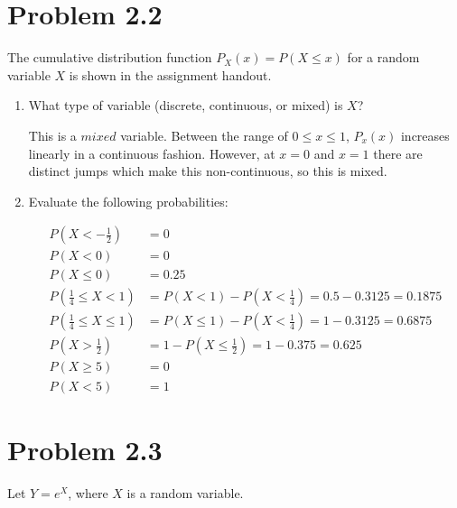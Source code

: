 \documentclass[11pt]{article}
\begin{document}
\newpage
\section*{Problem 2.2}
The cumulative distribution function $P_X(x) = P(X \leq x)$ for a random variable $X$ is shown in the assignment handout.

\begin{enumerate}[label=(\alph*)]
    \item What type of variable (discrete, continuous, or mixed) is $X$?
    \begin{solution}
        This is a $mixed$ variable.
        Between the range of $0 \leq x \leq 1$, $P_x(x)$ increases linearly in a continuous fashion.
        However, at $x = 0$ and $x = 1$ there are distinct jumps which make this non-continuous, so this is mixed.
    \end{solution}

    \vspace{2em}

    \item Evaluate the following probabilities:

    \begin{align*}
        P\left(X < -\tfrac{1}{2}\right) &= 0 \\[1.5em]
        P(X < 0) &= 0 \\[1.5em]
        P(X \leq 0) &= 0.25\\[1.5em]
        P\left(\tfrac{1}{4} \leq X < 1\right) &= P(X < 1) - P(X < \tfrac{1}{4}) = 0.5 - 0.3125 = 0.1875 \\[1.5em]
        P\left(\tfrac{1}{4} \leq X \leq 1\right) &= P(X \leq 1) - P(X < \tfrac{1}{4}) = 1 - 0.3125 = 0.6875 \\[1.5em]
        P\left(X > \tfrac{1}{2}\right) &= 1 - P(X \leq \tfrac{1}{2}) = 1 - 0.375 = 0.625 \\[1.5em]
        P(X \geq 5) &= 0\\[1.5em]
        P(X < 5) &= 1
    \end{align*}

\end{enumerate}

\newpage
\section*{Problem 2.3}
Let $Y = e^X$, where $X$ is a random variable.
\end{document}
